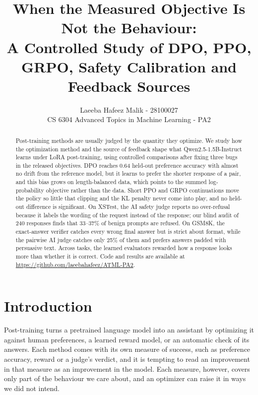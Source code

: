 \documentclass{article}
\title{When the Measured Objective Is Not the Behaviour:\\ A Controlled Study of DPO, PPO, GRPO, Safety Calibration and Feedback Sources}
\author{%
  Laeeba Hafeez Malik - 28100027
  \\ CS 6304 Advanced Topics in Machine Learning - PA2 \\
}
\begin{document}
\maketitle

\begin{abstract}
Post-training methods are usually judged by the quantity they optimize. We study how the optimization method and the source of feedback shape what Qwen2.5-1.5B-Instruct learns under LoRA post-training, using controlled comparisons after fixing three bugs in the released objectives. DPO reaches 0.64 held-out preference accuracy with almost no drift from the reference model, but it learns to prefer the shorter response of a pair, and this bias grows on length-balanced data, which points to the summed log-probability objective rather than the data. Short PPO and GRPO continuations move the policy so little that clipping and the KL penalty never come into play, and no held-out difference is significant. On XSTest, the AI safety judge reports no over-refusal because it labels the wording of the request instead of the response; our blind audit of 240 responses finds that 33--37\% of benign prompts are refused. On GSM8K, the exact-answer verifier catches every wrong final answer but is strict about format, while the pairwise AI judge catches only 25\% of them and prefers answers padded with persuasive text. Across tasks, the learned evaluators rewarded how a response looks more than whether it is correct. Code and results are available at \url{https://github.com/laeebahafeez/ATML-PA2}.
\end{abstract}

\section{Introduction}
Post-training turns a pretrained language model into an assistant by optimizing it against human preferences, a learned reward model, or an automatic check of its answers. Each method comes with its own measure of success, such as preference accuracy, reward or a judge's verdict, and it is tempting to read an improvement in that measure as an improvement in the model. Each measure, however, covers only part of the behaviour we care about, and an optimizer can raise it in ways we did not intend.
\end{document}
